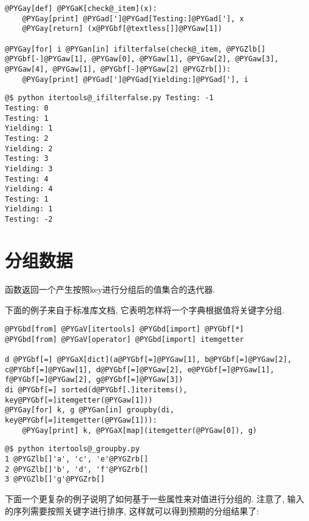 \documentclass[a4paper,10pt,english]{manual}
\begin{document}
\begin{Verbatim}[commandchars=@\[\]]
@PYGay[def] @PYGaK[check@_item](x):
    @PYGay[print] @PYGad[']@PYGad[Testing:]@PYGad['], x
    @PYGay[return] (x@PYGbf[@textless[]]@PYGaw[1])

@PYGay[for] i @PYGan[in] ifilterfalse(check@_item, @PYGZlb[] @PYGbf[-]@PYGaw[1], @PYGaw[0], @PYGaw[1], @PYGaw[2], @PYGaw[3], @PYGaw[4], @PYGaw[1], @PYGbf[-]@PYGaw[2] @PYGZrb[]):
    @PYGay[print] @PYGad[']@PYGad[Yielding:]@PYGad['], i
\end{Verbatim}

\begin{Verbatim}[commandchars=@\[\]]
@$ python itertools@_ifilterfalse.py Testing: -1
Testing: 0
Testing: 1
Yielding: 1
Testing: 2
Yielding: 2
Testing: 3
Yielding: 3
Testing: 4
Yielding: 4
Testing: 1
Yielding: 1
Testing: -2
\end{Verbatim}


\section{分组数据}

 函数返回一个产生按照key进行分组后的值集合的迭代器.

下面的例子来自于标准库文档, 它表明怎样将一个字典根据值将关键字分组.

\begin{Verbatim}[commandchars=@\[\]]
@PYGbd[from] @PYGaV[itertools] @PYGbd[import] @PYGbf[*]
@PYGbd[from] @PYGaV[operator] @PYGbd[import] itemgetter

d @PYGbf[=] @PYGaX[dict](a@PYGbf[=]@PYGaw[1], b@PYGbf[=]@PYGaw[2], c@PYGbf[=]@PYGaw[1], d@PYGbf[=]@PYGaw[2], e@PYGbf[=]@PYGaw[1], f@PYGbf[=]@PYGaw[2], g@PYGbf[=]@PYGaw[3])
di @PYGbf[=] sorted(d@PYGbf[.]iteritems(), key@PYGbf[=]itemgetter(@PYGaw[1]))
@PYGay[for] k, g @PYGan[in] groupby(di, key@PYGbf[=]itemgetter(@PYGaw[1])):
    @PYGay[print] k, @PYGaX[map](itemgetter(@PYGaw[0]), g)
\end{Verbatim}

\begin{Verbatim}[commandchars=@\[\]]
@$ python itertools@_groupby.py
1 @PYGZlb[]'a', 'c', 'e'@PYGZrb[]
2 @PYGZlb[]'b', 'd', 'f'@PYGZrb[]
3 @PYGZlb[]'g'@PYGZrb[]
\end{Verbatim}

下面一个更复杂的例子说明了如何基于一些属性来对值进行分组的. 注意了, 输入的序列需要按照关键字进行排序, 这样就可以得到预期的分组结果了:
\end{document}
